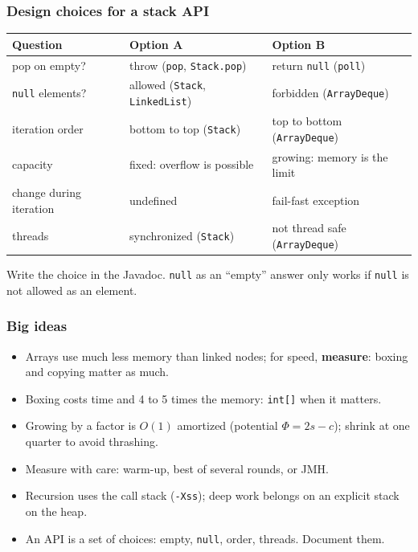 \documentclass[aspectratio=169,10pt,compress]{beamer}
\begin{document}
\begin{frame}[t,fragile] \frametitle{Design choices for a stack API}
  \begin{center}\small
  \begin{tabular}{lL{0.32\textwidth}L{0.32\textwidth}}
    \toprule
    \textbf{Question}            & \textbf{Option A}                          & \textbf{Option B} \\
    \midrule
    pop on empty?                & throw (\texttt{pop}, \texttt{Stack.pop})    & return \texttt{null} (\texttt{poll}) \\
    \texttt{null} elements?      & allowed (\texttt{Stack}, \texttt{LinkedList}) & forbidden (\texttt{ArrayDeque}) \\
    iteration order              & bottom to top (\texttt{Stack})              & top to bottom (\texttt{ArrayDeque}) \\
    capacity                     & fixed: overflow is possible                 & growing: memory is the limit \\
    change during iteration      & undefined                                   & fail-fast exception \\
    threads                      & synchronized (\texttt{Stack})               & not thread safe (\texttt{ArrayDeque}) \\
    \bottomrule
  \end{tabular}
  \end{center}
  \small Write the choice in the Javadoc. \texttt{null} as an ``empty'' answer only works if \texttt{null} is not allowed as an element.
\end{frame}





\begin{frame}[t,fragile] \frametitle{Big ideas}
  \begin{itemize}
    \item Arrays use much less memory than linked nodes; for speed, \textbf{measure}: boxing and copying matter as much.
    \item Boxing costs time and 4 to 5 times the memory: \texttt{int[]} when it matters.
    \item Growing by a factor is $O(1)$ amortized (potential $\Phi = 2s - c$); shrink at one quarter to avoid thrashing.
    \item Measure with care: warm-up, best of several rounds, or JMH.
    \item Recursion uses the call stack (\texttt{-Xss}); deep work belongs on an explicit stack on the heap.
    \item An API is a set of choices: empty, \texttt{null}, order, threads. Document them.
  \end{itemize}
\end{frame}
\end{document}
